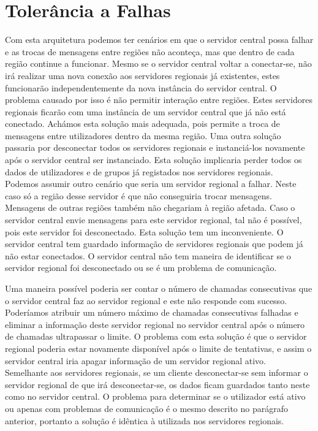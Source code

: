 \chapter{Tolerância a Falhas}

Com esta arquitetura podemos ter cenários em que o servidor central possa falhar e as trocas de mensagens entre regiões não aconteça, mas que dentro de cada região continue a funcionar. Mesmo se o servidor central voltar a conectar-se, não irá realizar uma nova conexão aos servidores regionais já existentes, estes funcionarão independentemente da nova instância do servidor central. O problema causado por isso é não permitir interação entre regiões. Estes servidores regionais ficarão com uma instância de um servidor central que já não está conectado. Achámos esta solução mais adequada, pois permite a troca de mensagens entre utilizadores dentro da mesma região. Uma outra solução passaria por desconectar todos os servidores regionais e instanciá-los novamente após o servidor central ser instanciado. Esta solução implicaria perder todos os dados de utilizadores e de grupos já registados nos servidores regionais.\\

Podemos assumir outro cenário que seria um servidor regional a falhar. Neste caso só a região desse servidor é que não conseguiria trocar mensagens. Mensagens de outras regiões também não chegariam à região afetada. Caso o servidor central envie mensagens para este servidor regional, tal não é possível, pois este servidor foi desconectado. Esta solução tem um inconveniente. O servidor central tem guardado informação de servidores regionais que podem já não estar conectados. O servidor central não tem maneira de identificar se o servidor regional foi desconectado ou se é um problema de comunicação.

Uma maneira possível poderia ser contar o número de chamadas consecutivas que o servidor central faz ao servidor regional e este não responde com sucesso. Poderíamos atribuir um número máximo de chamadas consecutivas falhadas e eliminar a informação deste servidor regional no servidor central após o número de chamadas ultrapassar o limite. O problema com esta solução é que o servidor regional poderia estar novamente disponível após o limite de tentativas, e assim o servidor central iria apagar informação de um servidor regional ativo.\\

Semelhante aos servidores regionais, se um cliente desconectar-se sem informar o servidor regional de que irá desconectar-se, os dados ficam guardados tanto neste como no servidor central. O problema para determinar se o utilizador está ativo ou apenas com problemas de comunicação é o mesmo descrito no parágrafo anterior, portanto a solução é idêntica à utilizada nos servidores regionais.
